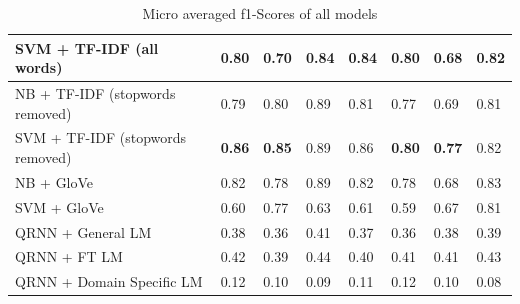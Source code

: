 \documentclass[a4paper,twoside,phd]{BYUPhys}
\begin{document}
\begin{table}[]
{\begin{tabular}{|p{2.6cm}|p{1.6cm}|p{1.6cm}|p{1.6cm}|p{1.6cm}|p{1.6cm}|p{1.6cm}|p{1.6cm}|}
		SVM + \newline TF-IDF \newline (all words)   & 0.80 & 0.70 & 0.84 & 0.84 & \textbf{0.80}  & 0.68  & 0.82                                                                                                                                             \\
		\hline
		
		NB + \newline TF-IDF \newline (stopwords \newline removed)  &  0.79 & 0.80  &  0.89 &  0.81 & 0.77   & 0.69   &  0.81  \\
		\hline
		
		SVM + \newline TF-IDF \newline (stopwords \newline removed)  &   \textbf{0.86} &  \textbf{0.85} & 0.89  &  0.86  &   \textbf{0.80}  & \textbf{0.77}  & 0.82  \\
		\hline
		
		NB + GloVe  & 0.82 & 0.78 & 0.89 & 0.82  & 0.78   & 0.68    & 0.83   \\
		\hline

		
		SVM + GloVe  & 0.60 & 0.77 & 0.63 & 0.61 & 0.59  & 0.67 & 0.81                                                                                                                                            \\		   
		\hline
		
		QRNN + General LM  & 0.38 & 0.36 & 0.41 & 0.37 & 0.36  & 0.38  & 0.39  \\
		\hline
		
		QRNN + FT LM  & 0.42 & 0.39 & 0.44 & 0.40 & 0.41 & 0.41  & 0.43   \\
		\hline
		
		QRNN + \newline Domain \newline Specific LM  & 0.12 & 0.10 & 0.09 & 0.11 & 0.12  & 0.10 & 0.08\\
		\hline                                                          
		                                                                                                                                                                  
	\end{tabular}}
	\caption{Micro averaged f1-Scores of all models}
	\label{table:AccuracyResults}
\end{table}
\end{document}
